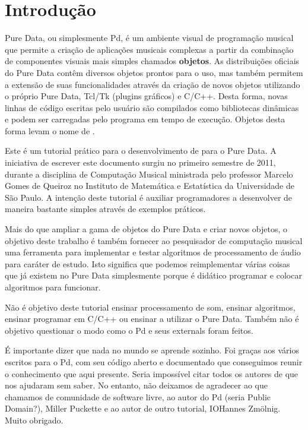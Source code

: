  
\chapter{Introdução}

Pure Data, ou simplesmente Pd, é um ambiente visual de programação musical que
permite a criação de aplicações musicais complexas a partir da combinação de
componentes visuais mais simples chamados \textbf{objetos}.
As distribuições oficiais do Pure Data contêm diversos objetos prontos para o
uso, mas também permitem a extensão de suas funcionalidades através da criação
de novos objetos utilizando o próprio Pure Data, Tcl/Tk (plugins gráficos) e C/C++.
Desta forma, novas linhas de código escritas pelo usuário são compilados como
bibliotecas dinâmicas e podem ser carregadas pelo programa em tempo de
execução.
Objetos desta forma levam o nome de \textbf{\externals}.

Este é um tutorial prático para o desenvolvimento de \externals para o
Pure Data.
A iniciativa de escrever este documento surgiu no primeiro semestre
de 2011, durante a disciplina de Computação Musical ministrada pelo professor
Marcelo Gomes de Queiroz no Instituto de Matemática e Estatística da
Universidade de São Paulo.
A intenção deste tutorial é auxiliar programadores a desenvolver \externals de
maneira bastante simples através de exemplos práticos.

Mais do que ampliar a gama de objetos do Pure Data e criar novos objetos, o
objetivo deste trabalho é também fornecer ao pesquisador de computação musical
uma ferramenta para implementar e testar algoritmos de processamento de áudio
para caráter de estudo.
Isto significa que podemos reimplementar várias coisas que já existem no Pure
Data simplesmente porque é didático programar e colocar algoritmos para
funcionar.

Não é objetivo deste tutorial ensinar processamento de som, ensinar algoritmos, 
ensinar programar em C/C++ ou ensinar a utilizar o Pure Data.
Também não é objetivo questionar o modo como o Pd e seus externals foram feitos.


É importante dizer que nada no mundo se aprende sozinho.
Foi graças aos vários \externals escritos para o Pd, com seu código aberto e
documentado que conseguimos reunir o conhecimento que aqui presente.
Seria impossível citar todos os autores  de \externals que nos ajudaram sem
saber.
No entanto, não deixamos de agradecer ao que chamamos de comunidade de software
livre, ao autor do Pd (seria Public Domain?),  Miller Puckette e ao autor de
outro tutorial, IOHannes Zmölnig.
Muito obrigado.

